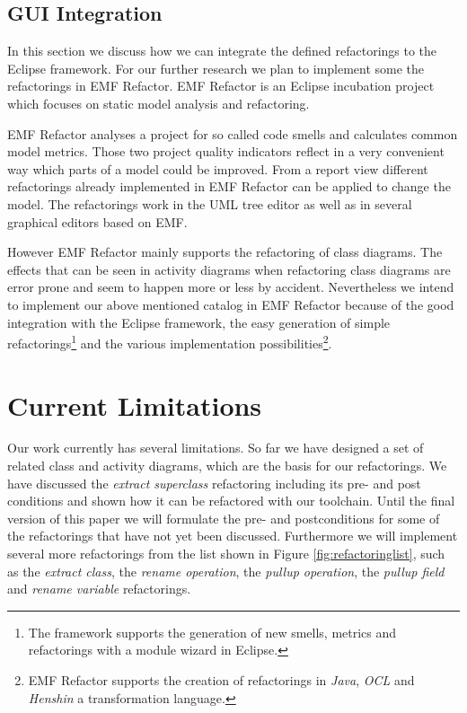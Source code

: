 \documentclass{llncs}
\begin{document}
\subsection{GUI Integration}
\label{sec:guiintegration}
In this section we discuss how we can integrate the defined refactorings to the Eclipse framework. For our further 
research we plan to implement some the refactorings in EMF Refactor. EMF Refactor is an Eclipse incubation project 
which focuses on static model analysis and refactoring.

EMF Refactor analyses a project for so called code smells and calculates common model metrics. Those two project quality 
indicators reflect in a very convenient way which parts of a model could be improved. From a report view different 
refactorings already implemented in EMF Refactor can be applied to change the model. The refactorings work in the UML tree 
editor as well as in several graphical editors based on EMF.

However EMF Refactor mainly supports the refactoring of class diagrams. The effects that can be seen in activity diagrams 
when refactoring class diagrams are error prone and seem to happen more or less by accident. Nevertheless we intend to 
implement our above mentioned catalog in EMF Refactor because of the good integration with the Eclipse framework, the 
easy generation of simple refactorings\footnote{The framework supports the generation of new smells, metrics and 
refactorings with a module wizard in Eclipse.} and the various implementation possibilities\footnote{EMF Refactor 
supports the creation of refactorings in \textit{Java}, \textit{OCL} and \textit{Henshin} a transformation language.}.

\section{Current Limitations}
\label{sec:limitations}
Our work currently has several limitations. So far we have designed a set of related class and activity diagrams,
which are the basis for our refactorings. We have discussed the \textit{extract superclass} refactoring including its
pre- and post conditions and shown how it can be refactored with our toolchain. Until the final version of this
paper we will formulate the pre- and postconditions for some of the refactorings that have not yet been discussed.
Furthermore we will implement several more refactorings from the list shown in Figure \ref{fig:refactoringlist}, such as the
\textit{extract class}, the \textit{rename operation}, the \textit{pullup operation}, the \textit{pullup field} and 
\textit{rename variable} refactorings.
\end{document}
